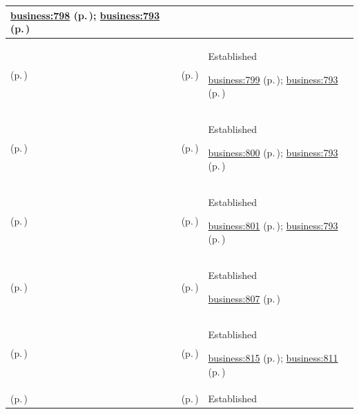 \begin{longtable}{|>{\raggedright\arraybackslash}p{0.27\TableWidth}|>{\raggedright\arraybackslash}p{0.27\TableWidth}|>{\raggedright\arraybackslash}p{0.46\TableWidth}|}
 \hyperref[rad:business:795]{business:798} (p.\,\pageref{rad:business:795}); \hyperref[rad:business:793]{business:793} (p.\,\pageref{rad:business:793})\\\hline
\nameref{cap:bc-health-information-protection} (p.\,\pageref{cap:bc-health-information-protection}) & \nameref{cap:bc-health-information-access-monitoring} (p.\,\pageref{cap:bc-health-information-access-monitoring}) & Established

 \hyperref[rad:business:795]{business:799} (p.\,\pageref{rad:business:795}); \hyperref[rad:business:793]{business:793} (p.\,\pageref{rad:business:793})\\\hline
\nameref{cap:bc-health-information-protection} (p.\,\pageref{cap:bc-health-information-protection}) & \nameref{cap:bc-health-information-compartment-assurance} (p.\,\pageref{cap:bc-health-information-compartment-assurance}) & Established

 \hyperref[rad:business:795]{business:800} (p.\,\pageref{rad:business:795}); \hyperref[rad:business:793]{business:793} (p.\,\pageref{rad:business:793})\\\hline
\nameref{cap:bc-health-information-protection} (p.\,\pageref{cap:bc-health-information-protection}) & \nameref{cap:bc-health-information-classification-assurance} (p.\,\pageref{cap:bc-health-information-classification-assurance}) & Established

 \hyperref[rad:business:795]{business:801} (p.\,\pageref{rad:business:795}); \hyperref[rad:business:793]{business:793} (p.\,\pageref{rad:business:793})\\\hline
\nameref{cap:bc-security-privacy-digital-trust} (p.\,\pageref{cap:bc-security-privacy-digital-trust}) & \nameref{cap:bc-digital-accountability-trust} (p.\,\pageref{cap:bc-digital-accountability-trust}) & Established

 \hyperref[rad:business:807]{business:807} (p.\,\pageref{rad:business:807})\\\hline
\nameref{cap:bc-digital-accountability-trust} (p.\,\pageref{cap:bc-digital-accountability-trust}) & \nameref{cap:bc-governed-activity-attribution} (p.\,\pageref{cap:bc-governed-activity-attribution}) & Established

 \hyperref[rad:business:813]{business:815} (p.\,\pageref{rad:business:813}); \hyperref[rad:business:811]{business:811} (p.\,\pageref{rad:business:811})\\\hline
\nameref{cap:bc-digital-accountability-trust} (p.\,\pageref{cap:bc-digital-accountability-trust}) & \nameref{cap:bc-security-information-use-accountability} (p.\,\pageref{cap:bc-security-information-use-accountability}) & Established


\end{longtable}
